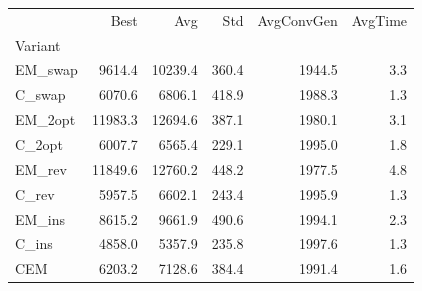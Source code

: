 \begin{tabular}{lrrrrr}
\toprule
 & Best & Avg & Std & AvgConvGen & AvgTime \\
Variant &  &  &  &  &  \\
\midrule
EM\_swap & 9614.4 & 10239.4 & 360.4 & 1944.5 & 3.3 \\
C\_swap & 6070.6 & 6806.1 & 418.9 & 1988.3 & 1.3 \\
EM\_2opt & 11983.3 & 12694.6 & 387.1 & 1980.1 & 3.1 \\
C\_2opt & 6007.7 & 6565.4 & 229.1 & 1995.0 & 1.8 \\
EM\_rev & 11849.6 & 12760.2 & 448.2 & 1977.5 & 4.8 \\
C\_rev & 5957.5 & 6602.1 & 243.4 & 1995.9 & 1.3 \\
EM\_ins & 8615.2 & 9661.9 & 490.6 & 1994.1 & 2.3 \\
C\_ins & 4858.0 & 5357.9 & 235.8 & 1997.6 & 1.3 \\
CEM & 6203.2 & 7128.6 & 384.4 & 1991.4 & 1.6 \\
\bottomrule
\end{tabular}
